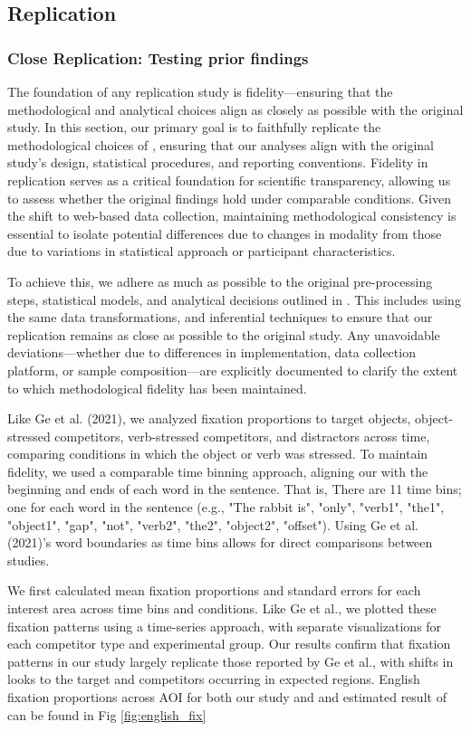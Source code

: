 \subsection{Replication}
\subsubsection{Close Replication: Testing prior findings}

The foundation of any replication study is fidelity—ensuring that the methodological and analytical choices align as closely as possible with the original study. In this section, our primary goal is to faithfully replicate the methodological choices of \citep{Ge2021}, ensuring that our analyses align with the original study’s design, statistical procedures, and reporting conventions. Fidelity in replication serves as a critical foundation for scientific transparency, allowing us to assess whether the original findings hold under comparable conditions. Given the shift to web-based data collection, maintaining methodological consistency is essential to isolate potential differences due to changes in modality from those due to variations in statistical approach or participant characteristics.

To achieve this, we adhere as much as possible to the original pre-processing steps, statistical models, and analytical decisions outlined in \citep{Ge2021}. This includes using the same data transformations, and inferential techniques to ensure that our replication remains as close as possible to the original study. Any unavoidable deviations—whether due to differences in implementation, data collection platform, or sample composition—are explicitly documented to clarify the extent to which methodological fidelity has been maintained.

Like Ge et al. (2021), we analyzed fixation proportions to target objects, object-stressed competitors, verb-stressed competitors, and distractors across time, comparing conditions in which the object or verb was stressed. To maintain fidelity, we used a comparable time binning approach, aligning our with the beginning and ends of each word in the sentence. That is, There are 11 time bins; one for each word in the sentence (e.g., "The rabbit is", "only", "verb1", "the1", "object1", "gap", "not", "verb2", "the2", "object2", "offset"). Using Ge et al. (2021)’s word boundaries as time bins allows for direct comparisons between studies.

We first calculated mean fixation proportions and standard errors for each interest area across time bins and conditions. Like Ge et al., we plotted these fixation patterns using a time-series approach, with separate visualizations for each competitor type and experimental group. Our results confirm that fixation patterns in our study largely replicate those reported by Ge et al., with shifts in looks to the target and competitors occurring in expected regions. English fixation proportions across AOI for both our study and and estimated result of \citep{Ge2021} can be found in Fig \ref{fig:english_fix}

